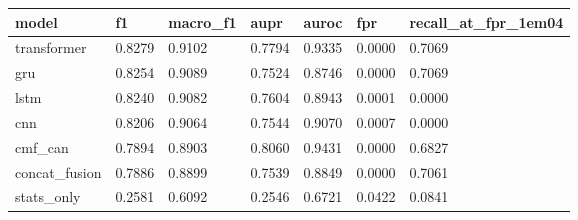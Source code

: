 \begin{tabular}{lllllll}
\toprule
model & f1 & macro\_f1 & aupr & auroc & fpr & recall\_at\_fpr\_1em04 \\
\midrule
transformer & 0.8279 & 0.9102 & 0.7794 & 0.9335 & 0.0000 & 0.7069 \\
gru & 0.8254 & 0.9089 & 0.7524 & 0.8746 & 0.0000 & 0.7069 \\
lstm & 0.8240 & 0.9082 & 0.7604 & 0.8943 & 0.0001 & 0.0000 \\
cnn & 0.8206 & 0.9064 & 0.7544 & 0.9070 & 0.0007 & 0.0000 \\
cmf\_can & 0.7894 & 0.8903 & 0.8060 & 0.9431 & 0.0000 & 0.6827 \\
concat\_fusion & 0.7886 & 0.8899 & 0.7539 & 0.8849 & 0.0000 & 0.7061 \\
stats\_only & 0.2581 & 0.6092 & 0.2546 & 0.6721 & 0.0422 & 0.0841 \\
\bottomrule
\end{tabular}
